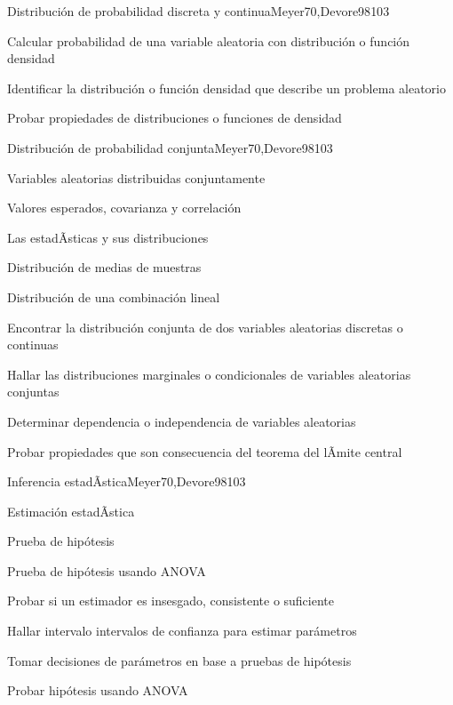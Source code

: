 \begin{syllabus}
\begin{unit}{Distribución de probabilidad discreta y continua}{Meyer70,Devore98}{10}{3}
   \begin{unitgoals}
      \item Calcular probabilidad de una variable aleatoria con distribución o función densidad
      \item Identificar la distribución o función densidad que describe un problema aleatorio
      \item Probar propiedades de distribuciones o funciones de densidad
   \end{unitgoals}
\end{unit}

\begin{unit}{Distribución de probabilidad conjunta}{Meyer70,Devore98}{10}{3}
\begin{topics}
      \item Variables aleatorias distribuidas conjuntamente
      \item Valores esperados, covarianza y correlación
      \item Las estadÃ­sticas y sus distribuciones
      \item Distribución de medias de muestras
      \item Distribución de una combinación lineal

   \end{topics}
   \begin{unitgoals}
      \item Encontrar la distribución conjunta de dos variables aleatorias discretas o continuas
      \item Hallar las distribuciones marginales o condicionales de variables aleatorias conjuntas
      \item Determinar dependencia o independencia de variables aleatorias
      \item Probar propiedades que son consecuencia del teorema  del lÃ­mite central
   \end{unitgoals}
\end{unit}

\begin{unit}{Inferencia estadÃ­stica}{Meyer70,Devore98}{10}{3}
\begin{topics}
      \item Estimación estadÃ­stica
      \item Prueba de hipótesis
      \item Prueba de hipótesis usando ANOVA
   \end{topics}

   \begin{unitgoals}
      \item Probar si un estimador es insesgado, consistente o suficiente
      \item Hallar intervalo intervalos de confianza para estimar parámetros
      \item Tomar decisiones de parámetros en base a pruebas de hipótesis
      \item Probar hipótesis usando ANOVA
   \end{unitgoals}
\end{unit}




\end{syllabus}
